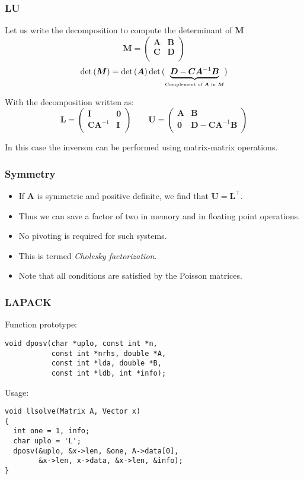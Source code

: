 \begin{frame}
  \frametitle{LU}

Let us write the decomposition to compute the determinant of $\bm M$
    \[
      \bm M =
      \begin{pmatrix}
        \bm A & \bm B \\
        \bm C & \bm D \\
      \end{pmatrix}
    \]
\[
\det{(\bm M)} = \det{(\bm A)} \det{(\underbrace{\bm D - \bm C \bm A^{-1} \bm B}_{\mbox{\tiny Complement of $\bm A$ in $\bm M$}})}
\]

With the decomposition written as:
    \[
      \bm L =
      \begin{pmatrix}
        \bm I & \bm 0 \\
        \bm C \bm A^{-1} &  \bm I \\
      \end{pmatrix}
      \qquad
      \bm U =
      \begin{pmatrix}
        \bm A & \bm B \\
        \bm 0 & \bm D - \bm C \bm A^{-1} \bm B \\
      \end{pmatrix}
    \]

\medskip
In this case the inverson can be performed using matrix-matrix operations.


\end{frame}



\begin{frame}
  \frametitle{Symmetry}
  \begin{itemize}
  \item If $\bm A$ is symmetric and positive definite, we find that
    $\bm U = \bm L^\intercal$.
  \item Thus we can save a factor of two in memory and in floating point
    operations.
  \item No pivoting is required for such systems.
  \item This is termed \emph{Cholesky factorization}.
  \item Note that all conditions are satisfied by the Poisson matrices.
  \end{itemize}
\end{frame}

\begin{frame}[fragile]
  \frametitle{LAPACK}
  Function prototype:
  \begin{lstlisting}[style=c]
void dposv(char *uplo, const int *n,
           const int *nrhs, double *A,
           const int *lda, double *B,
           const int *ldb, int *info);
  \end{lstlisting}
  Usage:
  \begin{lstlisting}[style=c]
void llsolve(Matrix A, Vector x)
{
  int one = 1, info;
  char uplo = 'L';
  dposv(&uplo, &x->len, &one, A->data[0],
        &x->len, x->data, &x->len, &info);
}
  \end{lstlisting}
\end{frame}


